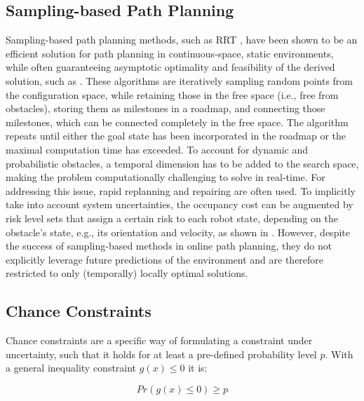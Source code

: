 \subsection{Sampling-based Path Planning}
Sampling-based path planning methods, such as RRT \cite{LaValle1998}, have been shown to be an efficient solution for path planning in continuous-space, static environments, while often guaranteeing asymptotic optimality and feasibility of the derived solution, such as \cite{Karaman2011}\cite{Luders}. These algorithms are iteratively sampling random points from the configuration space, while retaining those in the free space (i.e., free from obstacles), storing them as milestones in a roadmap, and connecting those milestones, which can be connected completely in the free space. The algorithm repeats until either the goal state has been incorporated in the roadmap or the maximal computation time has exceeded. To account for dynamic and probabilistic obstacles, a temporal dimension has to be added to the search space, making the problem computationally challenging to solve in real-time. For addressing this issue, rapid replanning and repairing \cite{Otte2014} are often used. To implicitly take into account system uncertainties, the occupancy cost can be augmented by risk level sets that assign a certain risk to each robot state, depending on the obstacle's state, e.g., its orientation and velocity, as shown in \cite{Pierson2018}\cite{Pierson2019}. However, despite the success of sampling-based methods in online path planning, they do not explicitly leverage future predictions of the environment and are therefore restricted to only (temporally) locally optimal solutions.

\subsection{Chance Constraints}
Chance constraints are a specific way of formulating a constraint under uncertainty, such that it holds for at least a pre-defined probability level $p$. With a general inequality constraint $g(x) \leq 0$ it is:

\begin{equation}
Pr(g(x) \leq 0) \geq p
\label{eq:chance_constraint}
\end{equation}

